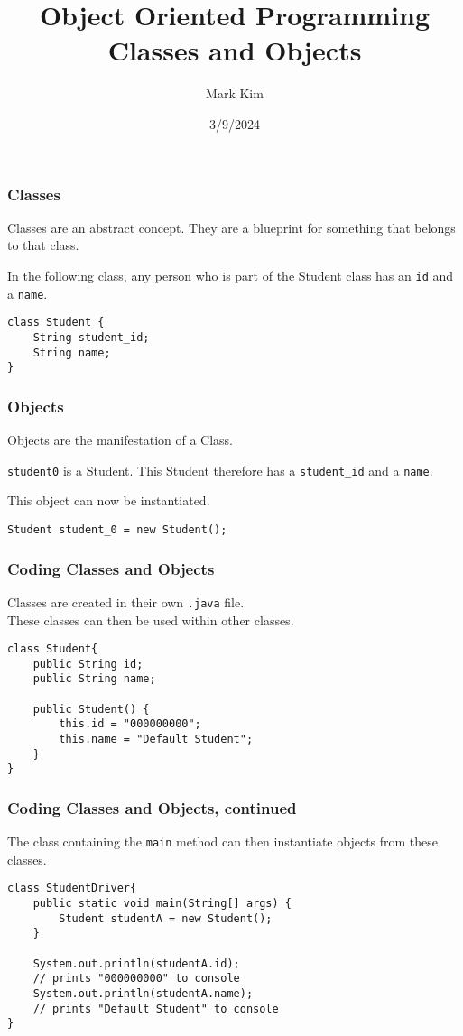 \documentclass[aspectratio=169]{beamer}
\title{Object Oriented Programming\\
\large Classes and Objects}
\author{Mark Kim}
\institute{San Francisco State University}
\date{3/9/2024}
\begin{document}
\frame{\titlepage}

\begin{frame}[fragile]
\frametitle{Classes}
Classes are an \alert{abstract} concept.  They are a blueprint for something
that belongs to that class.
\begin{example}
    In the following class, any person who is part of the Student class has
    an \verb|id| and a \verb|name|.
\begin{lstlisting}
class Student {
    String student_id;
    String name;
}
\end{lstlisting}
\end{example}
\end{frame}

\begin{frame}[fragile]
\frametitle{Objects}
Objects are the \alert{manifestation} of a Class.
\begin{example}
    \verb|student0| is a Student.  This Student therefore has a \verb|student_id| and a \verb|name|.
\end{example}
\vspace*{4mm}
This object can now be \alert{instantiated}.
\begin{example}
\begin{lstlisting}
Student student_0 = new Student();
\end{lstlisting}
\end{example}
\end{frame}

\begin{frame}[fragile]
\frametitle{Coding Classes and Objects}
Classes are created in their own \verb|.java| file.\\
These classes can then be used within other classes.

\begin{example}
\begin{lstlisting}
class Student{
    public String id;
    public String name;

    public Student() {
        this.id = "000000000";
        this.name = "Default Student";
    }
}
\end{lstlisting}
\end{example}
\end{frame}

\begin{frame}[fragile]
\frametitle{Coding Classes and Objects, continued}
The class containing the \verb|main| method can then instantiate
objects from these classes.
\begin{example}
\begin{lstlisting}
class StudentDriver{
    public static void main(String[] args) {
        Student studentA = new Student();
    }

    System.out.println(studentA.id);
    // prints "000000000" to console
    System.out.println(studentA.name);
    // prints "Default Student" to console
}
\end{lstlisting}
\end{example}
\end{frame}
\end{document}
